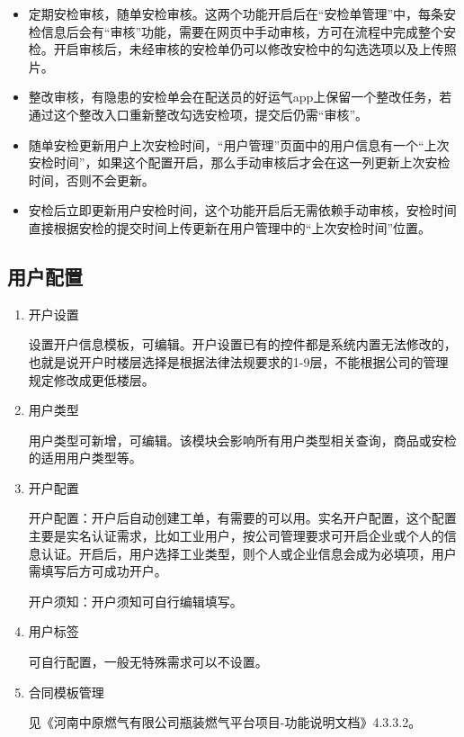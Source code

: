 \documentclass[UTF8]{ctexart}
\begin{document}
\begin{enumerate}
\begin{itemize}
	\item 定期安检审核，随单安检审核。这两个功能开启后在“安检单管理”中，每条安检信息后会有“审核”功能，需要在网页中手动审核，方可在流程中完成整个安检。开启审核后，未经审核的安检单仍可以修改安检中的勾选选项以及上传照片。
	
	\item 整改审核，有隐患的安检单会在配送员的好运气app上保留一个整改任务，若通过这个整改入口重新整改勾选安检项，提交后仍需“审核”。
	
	\item 随单安检更新用户上次安检时间，“用户管理”页面中的用户信息有一个“上次安检时间”，如果这个配置开启，那么手动审核后才会在这一列更新上次安检时间，否则不会更新。
	
	\item 安检后立即更新用户安检时间，这个功能开启后无需依赖手动审核，安检时间直接根据安检的提交时间上传更新在用户管理中的“上次安检时间”位置。
	\end{itemize}

\end{enumerate}


\subsection{用户配置}
\begin{enumerate}
	\item 开户设置
	
	设置开户信息模板，可编辑。开户设置已有的控件都是系统内置无法修改的，也就是说开户时楼层选择是根据法律法规要求的1-9层，不能根据公司的管理规定修改成更低楼层。
	
	\item 用户类型
	
	用户类型可新增，可编辑。该模块会影响所有用户类型相关查询，商品或安检的适用用户类型等。
	
	\item 开户配置
	
	开户配置：开户后自动创建工单，有需要的可以用。实名开户配置，这个配置主要是实名认证需求，比如工业用户，按公司管理要求可开启企业或个人的信息认证。开启后，用户选择工业类型，则个人或企业信息会成为必填项，用户需填写后方可成功开户。
	
	开户须知：开户须知可自行编辑填写。
	
	\item 用户标签
	
	可自行配置，一般无特殊需求可以不设置。
	
	\item 合同模板管理
	
	见《河南中原燃气有限公司瓶装燃气平台项目-功能说明文档》4.3.3.2。
	
\end{enumerate}
\end{document}
